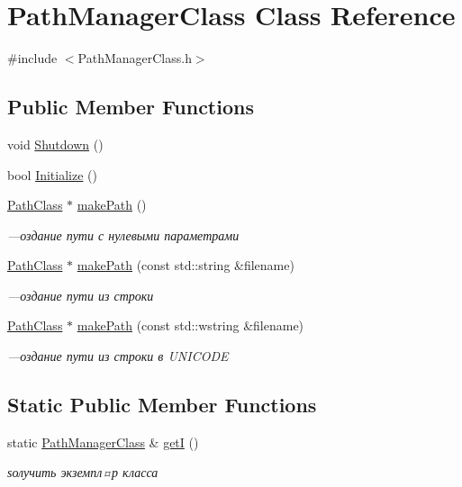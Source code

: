 \hypertarget{class_path_manager_class}{}\section{Path\+Manager\+Class Class Reference}
\label{class_path_manager_class}


{\ttfamily \#include $<$Path\+Manager\+Class.\+h$>$}

\subsection*{Public Member Functions}
\begin{DoxyCompactItemize}
\item 
void \hyperlink{class_path_manager_class_ab8f5564be2ffb04e48847840bfe0ff9f}{Shutdown} ()
\item 
bool \hyperlink{class_path_manager_class_a14e53ce1559defc57298eba81b9b5a41}{Initialize} ()
\item 
\hyperlink{class_path_class}{Path\+Class} $\ast$ \hyperlink{class_path_manager_class_a58cc1d2ec7956f2bb24d5383e969eaab}{make\+Path} ()
\begin{DoxyCompactList}\small\item\em —оздание пути с нулевыми параметрами \end{DoxyCompactList}\item 
\hyperlink{class_path_class}{Path\+Class} $\ast$ \hyperlink{class_path_manager_class_a88f48d8829e28eabd5550850e4066a79}{make\+Path} (const std\+::string \&filename)
\begin{DoxyCompactList}\small\item\em —оздание пути из строки \end{DoxyCompactList}\item 
\hyperlink{class_path_class}{Path\+Class} $\ast$ \hyperlink{class_path_manager_class_aa48ba4bada896b5a4f28e62ad3bdb753}{make\+Path} (const std\+::wstring \&filename)
\begin{DoxyCompactList}\small\item\em —оздание пути из строки в U\+N\+I\+C\+O\+DE \end{DoxyCompactList}\end{DoxyCompactItemize}
\subsection*{Static Public Member Functions}
\begin{DoxyCompactItemize}
\item 
static \hyperlink{class_path_manager_class}{Path\+Manager\+Class} \& \hyperlink{class_path_manager_class_ad1fe028daefa3cc848eb2409dded6e51}{getI} ()
\begin{DoxyCompactList}\small\item\em ѕолучить экземпл¤р класса \end{DoxyCompactList}\end{DoxyCompactItemize}
